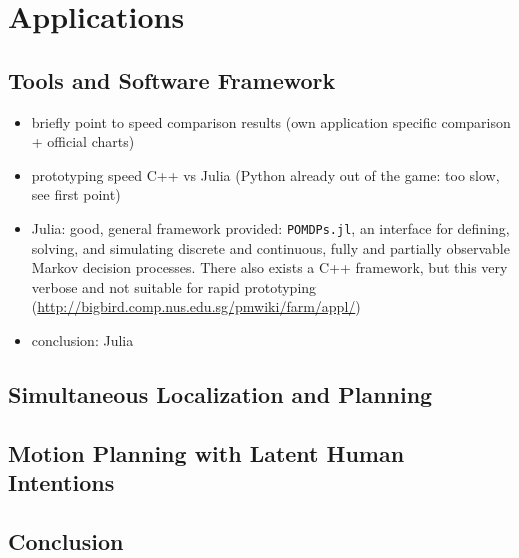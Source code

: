 \chapter{Applications}\label{chap:applications}

\section{Tools and Software Framework}

\begin{itemize}
  \item briefly point to speed comparison results (own application specific comparison + official charts)
  \item prototyping speed C++ vs Julia (Python already out of the game: too slow, see first point)
  \item Julia: good, general framework provided: \texttt{POMDPs.jl}, an interface for
  defining, solving, and simulating discrete and continuous, fully and
  partially observable Markov decision processes.  \cite{egorov2017pomdps}
  There also exists a C++ framework, but this very verbose and not suitable for
  rapid prototyping (\url{http://bigbird.comp.nus.edu.sg/pmwiki/farm/appl/})
  \item conclusion: Julia \cite{bezanson2017julia}
\end{itemize}

\section{Simultaneous Localization and Planning}

\section{Motion Planning with Latent Human Intentions}

\section{Conclusion}

